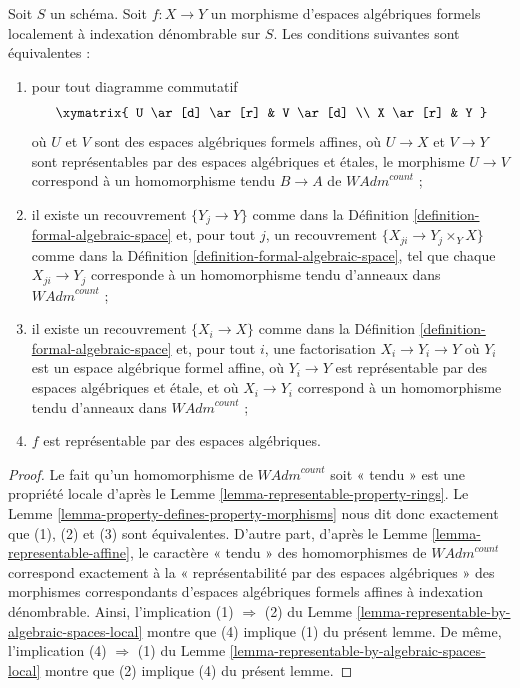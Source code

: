 \begin{lemma}
\label{lemma-representable-local-property}
Soit $S$ un schéma. Soit $f : X \to Y$ un morphisme d'espaces algébriques formels
localement à indexation dénombrable sur $S$.
Les conditions suivantes sont équivalentes :
\begin{enumerate}
\item pour tout diagramme commutatif
$$
\xymatrix{
U \ar[d] \ar[r] & V \ar[d] \\
X \ar[r] & Y
}
$$
où $U$ et $V$ sont des espaces algébriques formels affines, où $U \to X$ et $V \to Y$
sont représentables par des espaces algébriques et étales, le morphisme $U \to V$
correspond à un homomorphisme tendu $B \to A$ de $\textit{WAdm}^{count}$ ;
\item il existe un recouvrement $\{Y_j \to Y\}$ comme dans la
Définition \ref{definition-formal-algebraic-space} et, pour tout $j$,
un recouvrement $\{X_{ji} \to Y_j \times_Y X\}$ comme dans la
Définition \ref{definition-formal-algebraic-space},
tel que chaque $X_{ji} \to Y_j$ corresponde
à un homomorphisme tendu d'anneaux dans $\textit{WAdm}^{count}$ ;
\item il existe un recouvrement $\{X_i \to X\}$ comme dans la
Définition \ref{definition-formal-algebraic-space}
et, pour tout $i$, une factorisation $X_i \to Y_i \to Y$ où $Y_i$
est un espace algébrique formel affine, où $Y_i \to Y$ est représentable
par des espaces algébriques et étale, et où $X_i \to Y_i$ correspond
à un homomorphisme tendu d'anneaux dans $\textit{WAdm}^{count}$ ;
\item $f$ est représentable par des espaces algébriques.
\end{enumerate}
\end{lemma}

\begin{proof}
Le fait qu'un homomorphisme de $\textit{WAdm}^{count}$ soit
« tendu » est une propriété locale d'après le
Lemme \ref{lemma-representable-property-rings}.
Le Lemme \ref{lemma-property-defines-property-morphisms}
nous dit donc exactement que (1), (2) et (3) sont équivalentes.
D'autre part, d'après le Lemme \ref{lemma-representable-affine},
le caractère « tendu » des homomorphismes de $\textit{WAdm}^{count}$ correspond exactement à la
« représentabilité par des espaces algébriques » des morphismes correspondants
d'espaces algébriques formels affines à indexation dénombrable.
Ainsi, l'implication (1) $\Rightarrow$ (2) du
Lemme \ref{lemma-representable-by-algebraic-spaces-local}
montre que (4) implique (1) du présent lemme.
De même, l'implication (4) $\Rightarrow$ (1) du
Lemme \ref{lemma-representable-by-algebraic-spaces-local}
montre que (2) implique (4) du présent lemme.
\end{proof}









